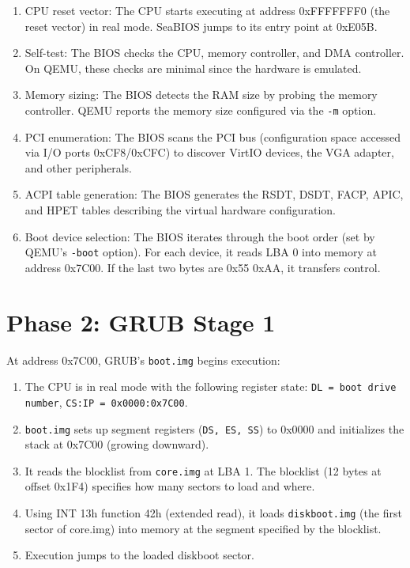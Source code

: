 \begin{enumerate}[nosep]
  \item CPU reset vector: The CPU starts executing at address 0xFFFFFFF0
        (the reset vector) in real mode. SeaBIOS jumps to its entry point
        at 0xE05B.
  \item Self-test: The BIOS checks the CPU, memory controller, and DMA
        controller. On QEMU, these checks are minimal since the hardware
        is emulated.
  \item Memory sizing: The BIOS detects the RAM size by probing the
        memory controller. QEMU reports the memory size configured via
        the \texttt{-m} option.
  \item PCI enumeration: The BIOS scans the PCI bus (configuration space
        accessed via I/O ports 0xCF8/0xCFC) to discover VirtIO devices,
        the VGA adapter, and other peripherals.
  \item ACPI table generation: The BIOS generates the RSDT, DSDT, FACP,
        APIC, and HPET tables describing the virtual hardware
        configuration.
  \item Boot device selection: The BIOS iterates through the boot order
        (set by QEMU's \texttt{-boot} option). For each device, it reads
        LBA 0 into memory at address 0x7C00. If the last two bytes are
        0x55 0xAA, it transfers control.
\end{enumerate}

\section{Phase 2: GRUB Stage 1}

At address 0x7C00, GRUB's \texttt{boot.img} begins execution:

\begin{enumerate}[nosep]
  \item The CPU is in real mode with the following register state:
        \texttt{DL = boot drive number}, \texttt{CS:IP = 0x0000:0x7C00}.
  \item \texttt{boot.img} sets up segment registers (\texttt{DS, ES, SS})
        to 0x0000 and initializes the stack at 0x7C00 (growing downward).
  \item It reads the blocklist from \texttt{core.img} at LBA 1. The
        blocklist (12 bytes at offset 0x1F4) specifies how many sectors
        to load and where.
  \item Using INT 13h function 42h (extended read), it loads
        \texttt{diskboot.img} (the first sector of core.img) into memory
        at the segment specified by the blocklist.
  \item Execution jumps to the loaded diskboot sector.
\end{enumerate}

